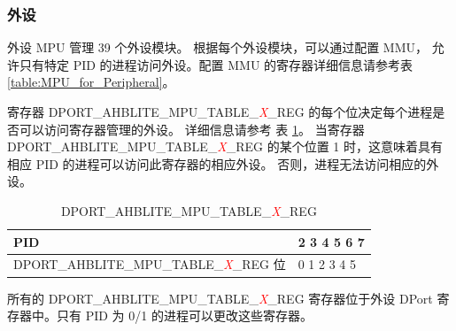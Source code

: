 
\subsubsection{外设}

外设 MPU 管理 39 个外设模块。 根据每个外设模块，可以通过配置 MMU， 允许只有特定 PID 的进程访问外设。配置 MMU 的寄存器详细信息请参考表 \ref{table:MPU_for_Peripheral}。



寄存器 DPORT\_AHBLITE\_MPU\_TABLE\_\textcolor{red}{\it{X}}\_REG 的每个位决定每个进程是否可以访问寄存器管理的外设。 详细信息请参考 表 \ref{table:DPORT_AHBLITE_MPU_TABLE_X_REG}。
当寄存器 DPORT\_AHBLITE\_MPU\_TABLE\_\textcolor{red}{\it{X}}\_REG 的某个位置 1 时，这意味着具有相应 PID 的进程可以访问此寄存器的相应外设。 否则，进程无法访问相应的外设。

\begin{table}[H]
    \centering
    \caption{DPORT\_AHBLITE\_MPU\_TABLE\_\textcolor{red}{\it{X}}\_REG}
    \label{table:DPORT_AHBLITE_MPU_TABLE_X_REG}
    \begin{tabular}{|p{11cm}|p{4cm}|}
   
        \hline
        \rowcolor{lightgray}
        PID & 2 3 4 5 6 7 \\
        \hline
        DPORT\_AHBLITE\_MPU\_TABLE\_\textcolor{red}{\it{X}}\_REG 位 & 0 1 2 3 4 5 \\
        \hline
    \end{tabular}
\end{table}

所有的 DPORT\_AHBLITE\_MPU\_TABLE\_\textcolor{red}{\it{X}}\_REG 寄存器位于外设 DPort 寄存器中。只有 PID 为 0/1 的进程可以更改这些寄存器。